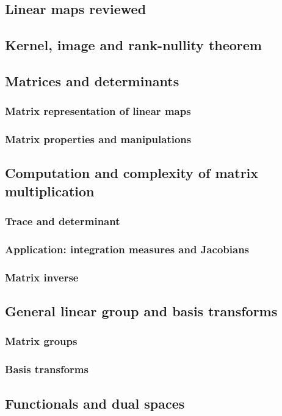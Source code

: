 \documentclass[a4paper,twoside]{article}
\theoremstyle{definition}
\theoremstyle{plain}
\begin{document}
\subsection{Linear maps reviewed}
\subsection{Kernel, image and rank-nullity theorem}
\subsection{Matrices and determinants}
\subsubsection{Matrix representation of linear maps}
\subsubsection{Matrix properties and manipulations}
\subsection{Computation and complexity of matrix multiplication}
\subsubsection{Trace and determinant}
\subsubsection{Application: integration measures and Jacobians}
\subsubsection{Matrix inverse}
\subsection{General linear group and basis transforms}
\subsubsection{Matrix groups}
\subsubsection{Basis transforms}
\subsection{Functionals and dual spaces}
\end{document}
